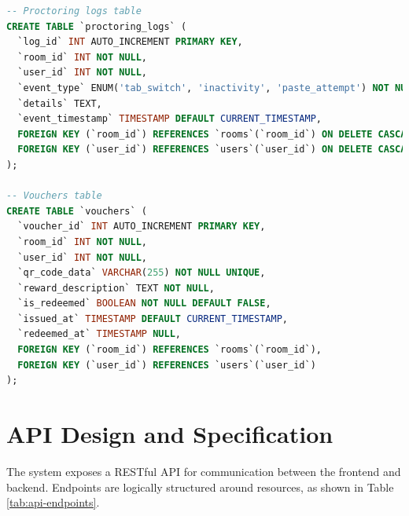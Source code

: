 \begin{lstlisting}[language=SQL, caption={SQL Schema for the `proctoring_logs` and `vouchers` tables}]
-- Proctoring logs table
CREATE TABLE `proctoring_logs` (
  `log_id` INT AUTO_INCREMENT PRIMARY KEY,
  `room_id` INT NOT NULL,
  `user_id` INT NOT NULL,
  `event_type` ENUM('tab_switch', 'inactivity', 'paste_attempt') NOT NULL,
  `details` TEXT,
  `event_timestamp` TIMESTAMP DEFAULT CURRENT_TIMESTAMP,
  FOREIGN KEY (`room_id`) REFERENCES `rooms`(`room_id`) ON DELETE CASCADE,
  FOREIGN KEY (`user_id`) REFERENCES `users`(`user_id`) ON DELETE CASCADE
);

-- Vouchers table
CREATE TABLE `vouchers` (
  `voucher_id` INT AUTO_INCREMENT PRIMARY KEY,
  `room_id` INT NOT NULL,
  `user_id` INT NOT NULL,
  `qr_code_data` VARCHAR(255) NOT NULL UNIQUE,
  `reward_description` TEXT NOT NULL,
  `is_redeemed` BOOLEAN NOT NULL DEFAULT FALSE,
  `issued_at` TIMESTAMP DEFAULT CURRENT_TIMESTAMP,
  `redeemed_at` TIMESTAMP NULL,
  FOREIGN KEY (`room_id`) REFERENCES `rooms`(`room_id`),
  FOREIGN KEY (`user_id`) REFERENCES `users`(`user_id`)
);
\end{lstlisting}

\section{API Design and Specification}
\label{sec:arch-api}
The system exposes a RESTful API for communication between the frontend and backend. Endpoints are logically structured around resources, as shown in Table \ref{tab:api-endpoints}.

\begin{table}[htbp]
\centering
\caption{Key API Endpoint Specifications}
\label{tab:api-endpoints}
\end{table}

